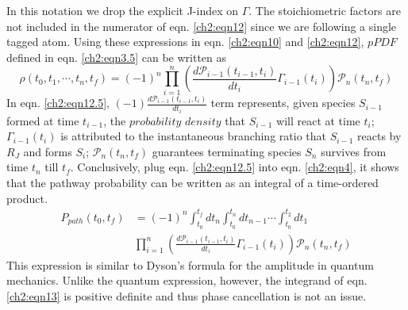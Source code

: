 In this notation we drop the explicit J-index on $\Gamma$. The stoichiometric factors are not
included in the numerator of eqn. \ref{ch2:eqn12} since we are following a single tagged
atom. Using these expressions in eqn. \ref{ch2:eqn10} and \ref{ch2:eqn12}, $pPDF$ defined in eqn. \ref{ch2:eqn3.5} can be written as 
\begin{equation}
\label{ch2:eqn12.5}
\rho(t_0, t_1, \cdots, t_n, t_f) = (-1)^n \prod_{i=1}^{n}{\left( \frac{d\mathcal{P}_{i-1}(t_{i-1},t_i)}{dt_i} \Gamma_{i-1}(t_i) \right) \mathcal{P}_{n}(t_n,t_f)}
\end{equation}
In eqn. \ref{ch2:eqn12.5}, $(-1)\frac{d\mathcal{P}_{i-1}(t_{i-1},t_i)}{dt_i}$ term represents, given species $S_{i-1}$ formed at time $t_{i-1}$, the $probability$ $density$ that $S_{i-1}$ will react at time $t_i$; $\Gamma_{i-1}(t_i)$ is attributed to the instantaneous branching ratio that $S_{i-1}$ reacts by $R_J$ and forms $S_i$; $\mathcal{P}_{n}(t_n,t_f)$ guarantees terminating species $S_n$ survives from time $t_n$ till $t_f$. Conclusively, plug eqn. \ref{ch2:eqn12.5} into eqn. \ref{ch2:eqn4}, it shows that the pathway probability can be
written as an integral of a time-ordered product.\cite{ch1_IRPC_16_ch3_6_ch4_8_bai2014sum,ch1_IRPC_17_ch4_9_bai2015sum}
\begin{equation}
\label{ch2:eqn13}
\begin{split}
P_{path}(t_0,t_f)&= (-1)^n \int_{t_0}^{t_f}{dt_n \int_{t_0}^{t_n}{dt_{n-1} \cdots }} \int_{t_0}^{t_2}{dt_1} \\
&  \prod_{i=1}^{n}{\left( \frac{d\mathcal{P}_{i-1}(t_{i-1},t_i)}{dt_i} \Gamma_{i-1}(t_i) \right) \mathcal{P}_{n}(t_n,t_f)}
\end{split}
\end{equation}
This expression is similar to Dyson's formula for the amplitude in quantum mechanics.\cite{ch1_IRPC_38_schulmann1996techniques,ch1_IRPC_39_mjolsness2013time} Unlike the quantum expression, however, the integrand of eqn. \ref{ch2:eqn13} is positive definite and thus phase cancellation is not an issue.
\newline
